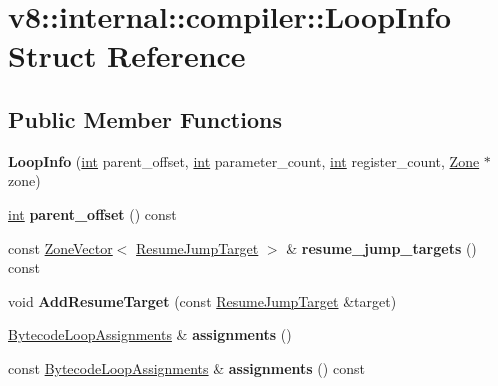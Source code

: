 \hypertarget{structv8_1_1internal_1_1compiler_1_1LoopInfo}{}\section{v8\+:\+:internal\+:\+:compiler\+:\+:Loop\+Info Struct Reference}
\label{structv8_1_1internal_1_1compiler_1_1LoopInfo}
\subsection*{Public Member Functions}
\begin{DoxyCompactItemize}
\item 
\mbox{\label{structv8_1_1internal_1_1compiler_1_1LoopInfo_a3c03fde2edf59c94cbfb8b0c9a1f4a1d}} 
{\bfseries Loop\+Info} (\mbox{\hyperlink{classint}{int}} parent\+\_\+offset, \mbox{\hyperlink{classint}{int}} parameter\+\_\+count, \mbox{\hyperlink{classint}{int}} register\+\_\+count, \mbox{\hyperlink{classv8_1_1internal_1_1Zone}{Zone}} $\ast$zone)
\item 
\mbox{\label{structv8_1_1internal_1_1compiler_1_1LoopInfo_a06718b85c331b84d8a1c2e659df93681}} 
\mbox{\hyperlink{classint}{int}} {\bfseries parent\+\_\+offset} () const
\item 
\mbox{\label{structv8_1_1internal_1_1compiler_1_1LoopInfo_afb5bd77621b4fb74da2c122a03e6e53e}} 
const \mbox{\hyperlink{classv8_1_1internal_1_1ZoneVector}{Zone\+Vector}}$<$ \mbox{\hyperlink{classv8_1_1internal_1_1compiler_1_1ResumeJumpTarget}{Resume\+Jump\+Target}} $>$ \& {\bfseries resume\+\_\+jump\+\_\+targets} () const
\item 
\mbox{\label{structv8_1_1internal_1_1compiler_1_1LoopInfo_a82d9e57a7d33615a43a0361739abdd47}} 
void {\bfseries Add\+Resume\+Target} (const \mbox{\hyperlink{classv8_1_1internal_1_1compiler_1_1ResumeJumpTarget}{Resume\+Jump\+Target}} \&target)
\item 
\mbox{\label{structv8_1_1internal_1_1compiler_1_1LoopInfo_ac829ac27a8252bf8e95ed8f7886091df}} 
\mbox{\hyperlink{classv8_1_1internal_1_1compiler_1_1BytecodeLoopAssignments}{Bytecode\+Loop\+Assignments}} \& {\bfseries assignments} ()
\item 
\mbox{\label{structv8_1_1internal_1_1compiler_1_1LoopInfo_a6fbdb4808842188d678b1b0dbab861cb}} 
const \mbox{\hyperlink{classv8_1_1internal_1_1compiler_1_1BytecodeLoopAssignments}{Bytecode\+Loop\+Assignments}} \& {\bfseries assignments} () const
\end{DoxyCompactItemize}


